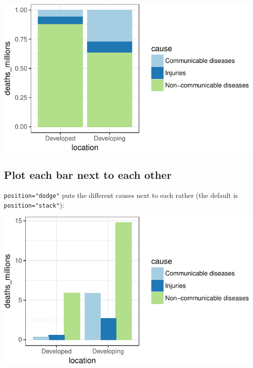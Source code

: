 \documentclass[12pt,]{krantz}
\makeatletter
\newenvironment{Shaded}{\begin{snugshade}}{\end{snugshade}}
\newcommand{\DataTypeTok}[1]{\textcolor[rgb]{0.13,0.29,0.53}{#1}}
\newcommand{\KeywordTok}[1]{\textcolor[rgb]{0.13,0.29,0.53}{\textbf{#1}}}
\newcommand{\NormalTok}[1]{#1}
\newcommand{\OperatorTok}[1]{\textcolor[rgb]{0.81,0.36,0.00}{\textbf{#1}}}
\newcommand{\StringTok}[1]{\textcolor[rgb]{0.31,0.60,0.02}{#1}}
\newenvironment{kframe}{%
\medskip{}
\setlength{\fboxsep}{.8em}
 \def\at@end@of@kframe{}%
 \ifinner\ifhmode%
  \def\at@end@of@kframe{\end{minipage}}%
  \begin{minipage}{\columnwidth}%
 \fi\fi%
 \def\FrameCommand##1{\hskip\@totalleftmargin \hskip-\fboxsep
 \colorbox{shadecolor}{##1}\hskip-\fboxsep
     \hskip-\linewidth \hskip-\@totalleftmargin \hskip\columnwidth}%
 \MakeFramed {\advance\hsize-\width
   \@totalleftmargin\z@ \linewidth\hsize
   \@setminipage}}%
 {\par\unskip\endMakeFramed%
 \at@end@of@kframe}
\renewenvironment{Shaded}{\begin{kframe}}{\end{kframe}}
\theoremstyle{definition}
\theoremstyle{definition}
\theoremstyle{definition}
\theoremstyle{remark}
\makeatother
\begin{document}
\includegraphics{01_first_interaction_files/figure-latex/unnamed-chunk-4-1.pdf}

\hypertarget{plot-each-bar-next-to-each-other}{%
\subsection{Plot each bar next to each
other}\label{plot-each-bar-next-to-each-other}}

\texttt{position="dodge"} puts the different causes next to each rather
(the default is \texttt{position="stack"}):

\begin{Shaded}
\end{Shaded}

\includegraphics{01_first_interaction_files/figure-latex/unnamed-chunk-5-1.pdf}
\end{document}
